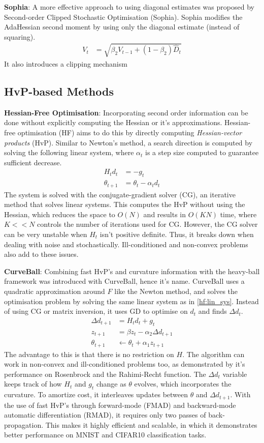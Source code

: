 \textbf{Sophia}: A more effective approach to using diagonal estimates was proposed by Second-order Clipped Stochastic Optimisation (Sophia). Sophia modifies the AdaHessian second moment by using only the diagonal estimate (instead of squaring).
\begin{align}
        V_t &= \sqrt{\beta_2 V_{t-1} + (1 - \beta_2) \hat{D}_t}
\end{align}
It also introduces a clipping mechanism 

\subsection{HvP-based Methods}
\textbf{Hessian-Free Optimisation}: Incorporating second order information can be done without explicitly computing the Hessian or it's approximations. Hessian-free optimisation (HF) aims to do this by directly computing \textit{Hessian-vector products} (HvP). Similar to Newton's method, a search direction is computed by solving the following linear system, where $\alpha_t$ is a step size computed to guarantee sufficient decrease.
\begin{align}
    H_t d_t &= - g_t \\ \label{hf:lin_sys}
    \theta_{t+1} &= \theta_t - \alpha_t d_t
\end{align}
The system is solved with the conjugate-gradient solver (CG), an iterative method that solves linear systems. This computes the HvP without using the Hessian, which reduces the space to $O(N)$ and results in $O(KN)$ time, where $K << N$ controls the number of iterations used for CG. However, the CG solver can be very unstable when $H_t$ isn't positive definite. Thus, it breaks down when dealing with noise and stochastically. Ill-conditioned and non-convex problems also add to these issues.

\textbf{CurveBall}: Combining fast HvP's and curvature information with the heavy-ball framework was introduced with CurveBall, hence it's name. CurveBall uses a quadratic approximation around $F$ like the Newton method, and solves the optimisation problem by solving the same linear system as in \cref{hf:lin_sys}. Instead of using CG or matrix inversion, it uses GD to optimise on $d_t$ and finds $\Delta d_t$. 
\begin{align}
\Delta d_{t+1} &= H_t d_t + g_t \\
z_{t+1} &= \beta z_{t} - \alpha_2 \Delta d_{t+1} \\
\theta_{t+1} &\leftarrow \theta_t + \alpha_1 z_{t+1}
\end{align}
The advantage to this is that there is no restriction on $H$. The algorithm can work in non-convex and ill-conditioned problems too, as demonstrated by it's performance on Rosenbrock and the Rahimi-Recht function. The $\Delta d_{t}$ variable keeps track of how $H_t$ and $g_t$ change as $\theta$ evolves, which incorporates the curvature. To amortize cost, it interleaves updates between $\theta$ and $\Delta d_{t+1}$. With the use of fast HvP's through forward-mode (FMAD) and backward-mode automatic differentiation (RMAD), it requires only two passes of back-propagation. This makes it highly efficient and scalable, in which it demonstrates better performance on MNIST and CIFAR10 classification tasks.  

